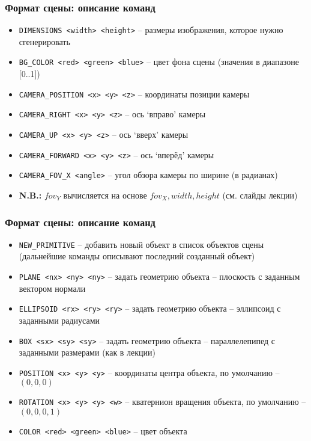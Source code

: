 \documentclass[10pt,handout]{beamer}
\begin{document}
\begin{frame}
\frametitle{Формат сцены: описание команд}
\begin{itemize}
\item \texttt{DIMENSIONS <width> <height>} -- размеры изображения, которое нужно сгенерировать
\item \texttt{BG\_COLOR <red> <green> <blue>} -- цвет фона сцены (значения в диапазоне [0..1])
\item \texttt{CAMERA\_POSITION <x> <y> <z>} -- координаты позиции камеры
\item \texttt{CAMERA\_RIGHT <x> <y> <z>} -- ось `вправо' камеры
\item \texttt{CAMERA\_UP <x> <y> <z>} -- ось `вверх' камеры
\item \texttt{CAMERA\_FORWARD <x> <y> <z>} -- ось `вперёд' камеры
\item \texttt{CAMERA\_FOV\_X <angle>} -- угол обзора камеры по ширине (в радианах)
\item \alert{\textbf{N.B.:}} \begin{math}fov_Y\end{math} вычисляется на основе \begin{math}fov_X, width, height\end{math} (см. слайды лекции)
\end{itemize}
\end{frame}

\begin{frame}
\frametitle{Формат сцены: описание команд}
\begin{itemize}
\item \texttt{NEW\_PRIMITIVE} -- добавить новый объект в список объектов сцены (дальнейшие команды описывают последний созданный объект)
\item \texttt{PLANE <nx> <ny> <ny>} -- задать геометрию объекта -- плоскость с заданным вектором нормали
\item \texttt{ELLIPSOID <rx> <ry> <ry>} -- задать геометрию объекта -- эллипсоид с заданными радиусами
\item \texttt{BOX <sx> <sy> <sy>} -- задать геометрию объекта -- параллелепипед с заданными размерами (как в лекции)
\item \texttt{POSITION <x> <y> <y>} -- координаты центра объекта, по умолчанию -- \begin{math}(0, 0, 0)\end{math}
\item \texttt{ROTATION <x> <y> <y> <w>} -- кватернион вращения объекта, по умолчанию -- \begin{math}(0, 0, 0, 1)\end{math}
\item \texttt{COLOR <red> <green> <blue>} -- цвет объекта
\end{itemize}
\end{frame}
\end{document}
